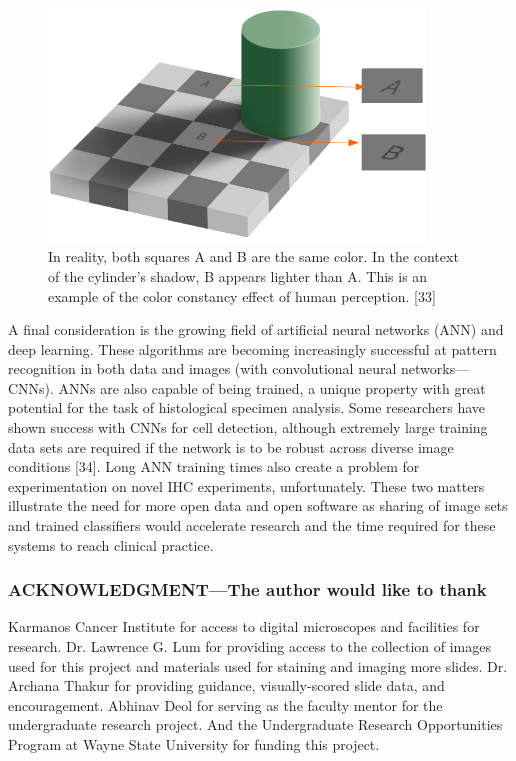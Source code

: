 \documentclass[12pt]{article}
\begin{document}
\begin{figure}[H]
  \centerline{\includegraphics[width=10cm]{13ColorConstancyIllusion.png}}
  \caption{In reality, both squares A and B are the same color. In the context of the cylinder's shadow, B appears lighter than A. This is an example of the color constancy effect of human perception. [33]}
  \label{fig:Color Constancy Illusion}
\end{figure}


A final consideration is the growing field of artificial neural networks (ANN) and deep learning.
These algorithms are becoming increasingly successful at pattern recognition in both data and images
(with convolutional neural networks---CNNs). ANNs are also capable of being trained, a unique
property with great potential for the task of histological specimen analysis. Some researchers have
shown success with CNNs for cell detection, although extremely large training data sets are required if
the network is to be robust across diverse image conditions [34]. Long ANN training times also create a
problem for experimentation on novel IHC experiments, unfortunately. These two matters illustrate the
need for more open data and open software as sharing of image sets and trained classifiers would
accelerate research and the time required for these systems to reach clinical practice.

\newpage
\subsubsection*{ACKNOWLEDGMENT---The author would like to thank}

Karmanos Cancer Institute for access to digital microscopes and facilities for research. Dr. Lawrence
G. Lum for providing access to the collection of images used for this project and materials used for
staining and imaging more slides. Dr. Archana Thakur for providing guidance, visually-scored slide
data, and encouragement. Abhinav Deol for serving as the faculty mentor for the undergraduate
research project. And the Undergraduate Research Opportunities Program at Wayne State University for funding this project.
\end{document}
